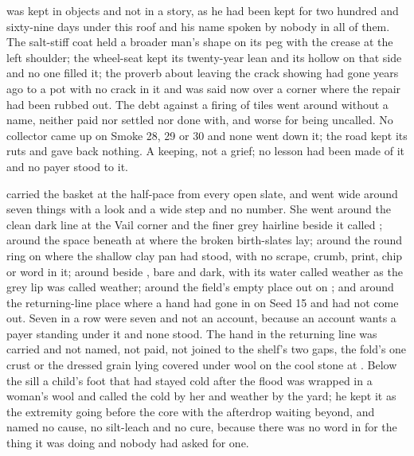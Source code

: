  was kept in objects and not in a story, as he had been kept for two hundred and sixty-nine days under this roof and his name spoken by nobody in all of them. The salt-stiff coat held a broader man's shape on its peg with the crease at the left shoulder; the wheel-seat kept its twenty-year lean and its hollow on that side and no one filled it; the proverb about leaving the crack showing had gone years ago to a pot with no crack in it and was said now over a corner where the repair had been rubbed out. The debt against a firing of tiles went around without a name, neither paid nor settled nor done with, and worse for being uncalled. No collector came up  on Smoke 28, 29 or 30 and none went down it; the road kept its ruts and gave back nothing. A keeping, not a grief; no lesson had been made of it and no payer stood to it.

 carried the basket at the half-pace from every open slate, and went wide around seven things with a look and a wide step and no number. She went around the clean dark line at the Vail corner and the finer grey hairline beside it called ; around the space beneath  at  where the broken birth-slates lay; around the round ring on  where the shallow clay pan had stood, with no scrape, crumb, print, chip or word in it; around  beside , bare and dark, with its water called weather as the grey lip was called weather; around the field's empty place out on ; and around the returning-line place where a hand had gone in on Seed 15 and had not come out. Seven in a row were seven and not an account, because an account wants a payer standing under it and none stood. The hand in the returning line was carried and not named, not paid, not joined to the shelf's two gaps, the fold's one crust or the dressed grain lying covered under wool on the cool stone at . Below the sill a child's foot that had stayed cold after the flood was wrapped in a woman's wool and called the cold by her and weather by the yard; he kept it as the extremity going before the core with the afterdrop waiting beyond, and named no cause, no silt-leach and no cure, because there was no word in  for the thing it was doing and nobody had asked for one.

\scenebreak

